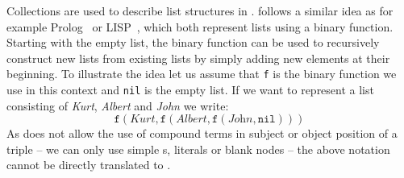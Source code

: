 % 
% 
Collections are used to describe list structures in \rdf.
\rdf follows a similar idea as for example Prolog~\cite{Prolog,nilsson} or LISP~\cite{lisp}, which both represent lists using a binary 
function. %
Starting with the empty list, the binary function can be used to recursively construct new lists from existing lists by simply adding new elements at their beginning.
To illustrate the idea let us assume that \texttt{f} is the binary function we use in this context and \texttt{nil} is the empty list. If we want to represent a list consisting of 
\emph{Kurt}, \emph{Albert} and \emph{John} we write:
\begin{equation}\label{flist}
 \texttt{f}(\textit{Kurt}, \texttt{f}(\textit{Albert}, \texttt{f}(\textit{John}, \texttt{nil})))
\end{equation}
As \rdf does not allow the use of compound terms in subject or object position of a triple -- we can only use simple \iri{}s, literals or blank nodes -- the above notation cannot be directly
translated to \rdf. %

